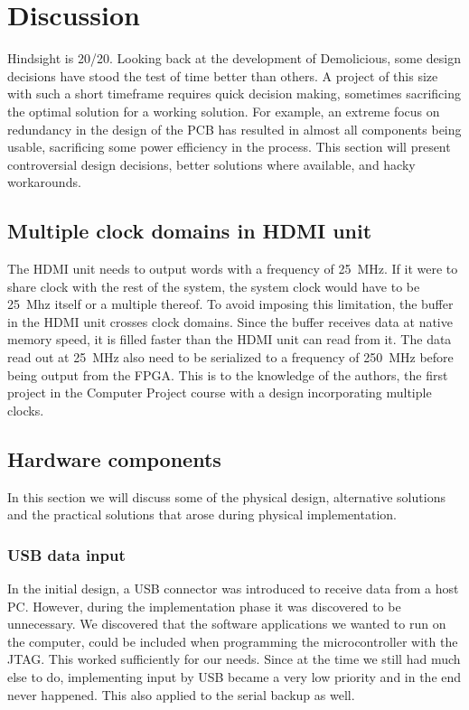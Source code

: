 \documentclass[../main/report.tex]{subfiles}
\begin{document}
\chapter{Discussion}

Hindsight is 20/20.
Looking back at the development of Demolicious, some design decisions have stood the test of time better than others.
A project of this size with such a short timeframe requires quick decision making, sometimes sacrificing the optimal solution for a working solution.
For example, an extreme focus on redundancy in the design of the PCB has resulted in almost all components being usable, sacrificing some power efficiency in the process.
This section will present controversial design decisions, better solutions where available, and hacky workarounds.







\section{Multiple clock domains in HDMI unit}
The HDMI unit needs to output words with a frequency of \SI{25}{MHz}.
If it were to share clock with the rest of the system, the system clock would have to be \SI{25}{Mhz} itself or a multiple thereof.
To avoid imposing this limitation, the buffer in the HDMI unit crosses clock domains.
Since the buffer receives data at native memory speed, it is filled faster than the HDMI unit can read from it.
The data read out at \SI{25}{MHz} also need to be serialized to a frequency of \SI{250}{MHz} before being output from the FPGA.
This is to the knowledge of the authors, the first project in the Computer Project course with a design incorporating multiple clocks.



\section{Hardware components}
In this section we will discuss some of the physical design, alternative solutions and the practical solutions that arose during physical implementation.

\subsection*{USB data input}
In the initial design, a USB connector was introduced to receive data from a host PC. 
However, during the implementation phase it was discovered to be unnecessary.
We discovered that the software applications we wanted to run on the computer, could be included when programming the microcontroller with the JTAG.
This worked sufficiently for our needs. 
Since at the time we still had much else to do, implementing input by USB became a very low priority and in the end never happened.
This also applied to the serial backup as well.
\end{document}
